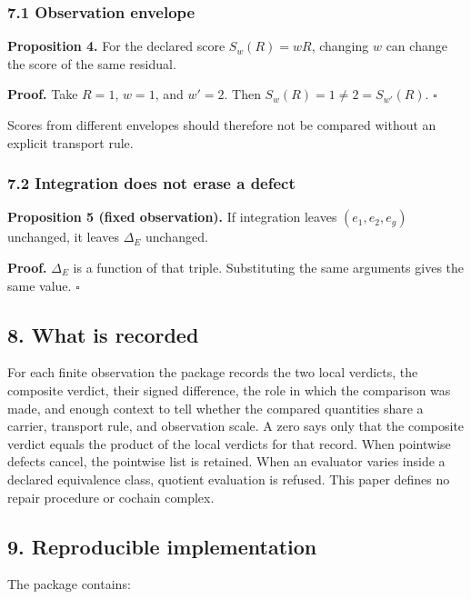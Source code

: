 \documentclass[
  11pt,
]{article}
\theoremstyle{plain}
\theoremstyle{definition}\newtheorem{definition}[theorem]{Definition}
\theoremstyle{remark}\newtheorem*{remark}{Remark}
\begin{document}
\subsubsection{7.1 Observation envelope}\label{observation-envelope}

\textbf{Proposition 4.} For the declared score
\(S_w(R)=wR\), changing \(w\) can change the score of the same residual.

\textbf{Proof.} Take \(R=1\), \(w=1\), and \(w'=2\). Then
\(S_w(R)=1\ne2=S_{w'}(R)\). \(\square\)

Scores from different envelopes should therefore not be compared without an
explicit transport rule.

\subsubsection{7.2 Integration does not erase a defect}\label{integration-does-not-erase-a-defect}

\textbf{Proposition 5 (fixed observation).} If integration
leaves \((e_1,e_2,e_g)\) unchanged, it leaves \(\Delta_E\) unchanged.

\textbf{Proof.} \(\Delta_E\) is a function of that triple. Substituting the same
arguments gives the same value. \(\square\)

\subsection{8. What is recorded}\label{what-is-recorded}

For each finite observation the package records the two local verdicts, the
composite verdict, their signed difference, the role in which the comparison
was made, and enough context to tell whether the compared quantities share a
carrier, transport rule, and observation scale. A zero says only that the
composite verdict equals the product of the local verdicts for that record.
When pointwise defects cancel, the pointwise list is retained. When an
evaluator varies inside a declared equivalence class, quotient evaluation is
refused. This paper defines no repair procedure or cochain complex.

\subsection{9. Reproducible implementation}\label{reproducible-implementation}

The package contains:
\end{document}
